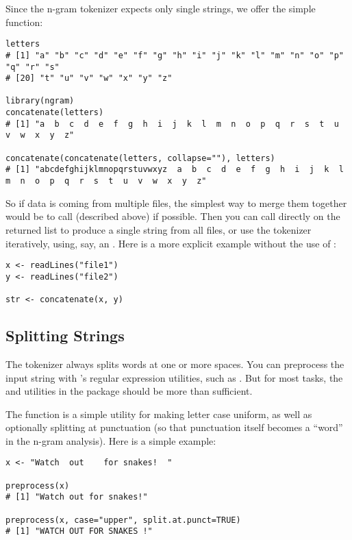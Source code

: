 Since the n-gram tokenizer expects only single strings, we offer the simple  function:
\begin{lstlisting}[language=rr]
letters
# [1] "a" "b" "c" "d" "e" "f" "g" "h" "i" "j" "k" "l" "m" "n" "o" "p" "q" "r" "s"
# [20] "t" "u" "v" "w" "x" "y" "z"

library(ngram)
concatenate(letters)
# [1] "a  b  c  d  e  f  g  h  i  j  k  l  m  n  o  p  q  r  s  t  u  v  w  x  y  z"

concatenate(concatenate(letters, collapse=""), letters)
# [1] "abcdefghijklmnopqrstuvwxyz  a  b  c  d  e  f  g  h  i  j  k  l  m  n  o  p  q  r  s  t  u  v  w  x  y  z"
\end{lstlisting}
So if data is coming from multiple files, the simplest way to merge them 
together would be to call  (described above) if possible.  Then you can call  directly on the returned list to produce a single string from all files, or use the tokenizer iteratively, using, say, an .  Here is a more explicit example without the use of :
\begin{lstlisting}[language=rr]
x <- readLines("file1")
y <- readLines("file2")

str <- concatenate(x, y)
\end{lstlisting}



\subsection{Splitting Strings}

The  tokenizer always splits words at one or more spaces. You can preprocess the input string with \R's regular expression utilities, such as .  But for most tasks, the  and  utilities in the \thispackage package should be more than sufficient.


The  function is a simple utility for making letter case uniform, as well as optionally splitting at punctuation (so that punctuation itself becomes a ``word'' in the n-gram analysis).  Here is a simple example:
\begin{lstlisting}[language=rr]
x <- "Watch  out    for snakes!  "

preprocess(x)
# [1] "Watch out for snakes!"

preprocess(x, case="upper", split.at.punct=TRUE)
# [1] "WATCH OUT FOR SNAKES !"
\end{lstlisting}

